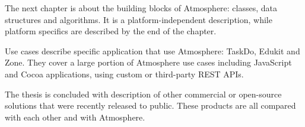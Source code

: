 The next chapter is about the building blocks of Atmosphere: classes, data structures and algorithms. It is a platform-independent description, while platform specifics are described by the end of the chapter.

Use cases describe specific application that use Atmosphere: TaskDo, Edukit and Zone. They cover a large portion of Atmosphere use cases including JavaScript and Cocoa applications, using custom or third-party REST APIs.

The thesis is concluded with description of other commercial or open-source solutions that were recently released to public. These products are all compared with each other and with Atmosphere. 